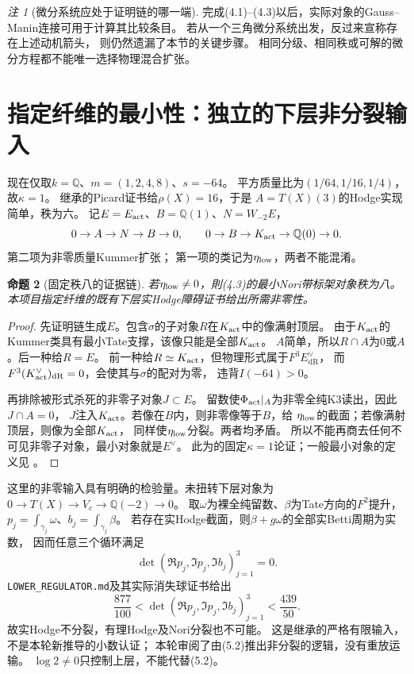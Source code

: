 \documentclass[11pt,a4paper]{ctexart}
\theoremstyle{cnplain}\newtheorem{theorem}{定理}[section]
\newtheorem{proposition}[theorem]{命题}
\theoremstyle{remark}\newtheorem{remark}[theorem]{注}
\newcommand{\Q}{\mathbb Q}\newcommand{\C}{\mathbb C}\newcommand{\Z}{\mathbb Z}
\newcommand{\dR}{\mathrm{dR}}\newcommand{\B}{\mathrm B}
\begin{document}
\begin{remark}[微分系统应处于证明链的哪一端]
完成(4.1)--(4.3)以后，实际对象的Gauss--Manin连接可用于计算其比较条目。
若从一个三角微分系统出发，反过来宣称存在上述动机箭头，
则仍然遗漏了本节的关键步骤。
相同分级、相同秩或可解的微分方程都不能唯一选择物理混合扩张。
\end{remark}

\section{指定纤维的最小性：独立的下层非分裂输入}
现在仅取$k=\Q$、$m=(1,2,4,8)$、$s=-64$。
平方质量比为$(1/64,1/16,1/4)$，故$\kappa=1$。
继承的Picard证书给$\rho(X)=16$，于是
$A=T(X)(3)$的Hodge实现简单，秩为六。
记$E=E_{\rm act}$、$B=\Q(1)$、$N=W_{-2}E$，
\[
 0\to A\to N\to B\to0,\qquad
 0\to B\to K_{\rm act}\to\Q(0)\to0.
\]
第二项为非零质量Kummer扩张；
第一项的类记为$\eta_{\rm low}$，两者不能混淆。

\begin{proposition}[固定秩八的证据链]\label{prop:min}
若$\eta_{\rm low}\ne0$，則(4.3)的最小Nori带标架对象秩为八。
本项目指定纤维的既有下层实Hodge障碍证书给出所需非零性。
\end{proposition}
\begin{proof}
先证明链生成$E$。包含$\sigma$的子对象$R$在$K_{\rm act}$中的像满射顶层。
由于$K_{\rm act}$的Kummer类具有最小Tate支撑，该像只能是全部$K_{\rm act}$。
$A$简单，所以$R\cap A$为$0$或$A$。后一种给$R=E$。
前一种给$R\simeq K_{\rm act}$，但物理形式属于$F^3E^\vee_\dR$，
而$F^3(K_{\rm act}^{\vee})_\dR=0$，会使其与$\sigma$的配对为零，
违背$I(-64)>0$。

再排除被形式杀死的非零子对象$J\subset E$。
留数使$\Phi_{\rm act}|_A$为非零全纯K3读出，因此$J\cap A=0$，
$J$注入$K_{\rm act}$。若像在$B$内，则非零像等于$B$，给
$\eta_{\rm low}$的截面；若像满射顶层，则像为全部$K_{\rm act}$，
同样使$\eta_{\rm low}$分裂。两者均矛盾。
所以不能再商去任何不可见非零子对象，最小对象就是$E^\vee$。
此为\cite{Minimal}的固定$\kappa=1$论证；一般最小对象的定义见
\cite[\S2.4]{Brown}。
\end{proof}

这里的非零输入具有明确的检验量。未扭转下层对象为
$0\to T(X)\to V_c\to\Q(-2)\to0$。
取$\omega$为裸全纯留数、$\beta$为Tate方向的$F^2$提升，
$p_j=\int_{\gamma_j}\omega$、$b_j=\int_{\gamma_j}\beta$。
若存在实Hodge截面，则$\beta+g\omega$的全部实Betti周期为实数，
因而任意三个循环满足
\[
 \det(\Re p_j,\Im p_j,\Im b_j)_{j=1}^3=0.                       \tag{5.1}
\]
\texttt{LOWER\_REGULATOR.md}及其实际消失球证书给出
\[
 \frac{877}{100}
 <\det(\Re p_j,\Im p_j,\Im b_j)_{j=1}^3
 <\frac{439}{50}.                                               \tag{5.2}
\]
故实Hodge不分裂，有理Hodge及Nori分裂也不可能。
这是继承的严格有限输入，不是本轮新推导的小数认证；
本轮审阅了由(5.2)推出非分裂的逻辑，没有重放运输。
$\log2\ne0$只控制上层，不能代替(5.2)。
\end{document}

